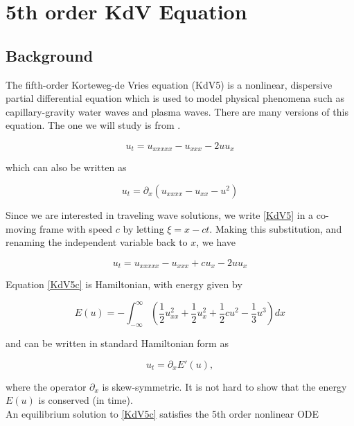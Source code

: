 \documentclass[12pt]{article}
\begin{document}
\section{5th order KdV Equation}

\subsection{Background}\label{sec:background}

The fifth-order Korteweg-de Vries equation (KdV5) is a nonlinear, dispersive partial differential equation which is used to model physical phenomena such as capillary-gravity water waves and plasma waves. There are many versions of this equation. The one we will study is from \cite{Pelinovsky2007}.

\begin{equation}\label{KdV5}
u_t = u_{xxxxx} - u_{xxx} - 2 u u_x
\end{equation}

which can also be written as

\begin{equation}\label{KdV5alt}
u_t = \partial_x(u_{xxxx} - u_{xx} - u^2)
\end{equation}

Since we are interested in traveling wave solutions, we write \eqref{KdV5} in a co-moving frame with speed $c$ by letting $\xi = x - ct$. Making this substitution, and renaming the independent variable back to $x$, we have

\begin{equation}\label{KdV5c}
u_t = u_{xxxxx} - u_{xxx} + c u_x - 2 u u_x
\end{equation}

Equation \eqref{KdV5c} is Hamiltonian, with energy given by 

\begin{equation} \label{energy}
E(u) = -\int_{-\infty}^{\infty} \left( \frac{1}{2}u_{xx}^2 + \frac{1}{2}u_x^2 + \frac{1}{2}cu^2 - \frac{1}{3}u^3 \right) dx
\end{equation}

and can be written in standard Hamiltonian form as

\[
u_t = \partial_x E'(u),
\]

where the operator $\partial_x$ is skew-symmetric. It is not hard to show that the energy $E(u)$ is conserved (in time).\\

An equilibrium solution to \eqref{KdV5c} satisfies the 5th order nonlinear ODE
\end{document}
